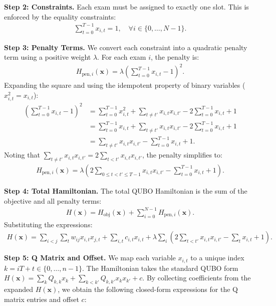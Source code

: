 \documentclass[12pt]{article}
\begin{document}
\textbf{Step 2: Constraints.}
Each exam must be assigned to exactly one slot. This is enforced by the equality constraints:
\begin{align}
    \sum_{t=0}^{T-1} x_{i,t} = 1, \quad \forall i \in \{0, \dots, N-1\}.
\end{align}

\textbf{Step 3: Penalty Terms.}
We convert each constraint into a quadratic penalty term using a positive weight $\lambda$. For each exam $i$, the penalty is:
\begin{align}
    H_{\text{pen}, i}(\mathbf{x}) = \lambda \left( \sum_{t=0}^{T-1} x_{i,t} - 1 \right)^2.
\end{align}
Expanding the square and using the idempotent property of binary variables ($x_{i,t}^2 = x_{i,t}$):
\begin{align}
    \left( \sum_{t=0}^{T-1} x_{i,t} - 1 \right)^2 &= \sum_{t=0}^{T-1} x_{i,t}^2 + \sum_{t \neq t'} x_{i,t} x_{i,t'} - 2 \sum_{t=0}^{T-1} x_{i,t} + 1 \nonumber \\
    &= \sum_{t=0}^{T-1} x_{i,t} + \sum_{t \neq t'} x_{i,t} x_{i,t'} - 2 \sum_{t=0}^{T-1} x_{i,t} + 1 \nonumber \\
    &= \sum_{t \neq t'} x_{i,t} x_{i,t'} - \sum_{t=0}^{T-1} x_{i,t} + 1.
\end{align}
Noting that $\sum_{t \neq t'} x_{i,t} x_{i,t'} = 2 \sum_{t < t'} x_{i,t} x_{i,t'}$, the penalty simplifies to:
\begin{align}
    H_{\text{pen}, i}(\mathbf{x}) = \lambda \left( 2 \sum_{0 \le t < t' \le T-1} x_{i,t} x_{i,t'} - \sum_{t=0}^{T-1} x_{i,t} + 1 \right).
\end{align}

\textbf{Step 4: Total Hamiltonian.}
The total QUBO Hamiltonian is the sum of the objective and all penalty terms:
\begin{align}
    H(\mathbf{x}) = H_{\text{obj}}(\mathbf{x}) + \sum_{i=0}^{N-1} H_{\text{pen}, i}(\mathbf{x}).
\end{align}
Substituting the expressions:
\begin{align}
    H(\mathbf{x}) = \sum_{i<j} \sum_{t} w_{ij} x_{i,t} x_{j,t} + \sum_{i,t} c_{i,t} x_{i,t} + \lambda \sum_{i} \left( 2 \sum_{t < t'} x_{i,t} x_{i,t'} - \sum_{t} x_{i,t} + 1 \right).
\end{align}

\textbf{Step 5: Q Matrix and Offset.}
We map each variable $x_{i,t}$ to a unique index $k = i T + t \in \{0, \dots, n-1\}$. The Hamiltonian takes the standard QUBO form $H(\mathbf{x}) = \sum_{k} Q_{k,k} x_k + \sum_{k < k'} Q_{k,k'} x_k x_{k'} + c$. By collecting coefficients from the expanded $H(\mathbf{x})$, we obtain the following closed-form expressions for the Q matrix entries and offset $c$:
\end{document}
